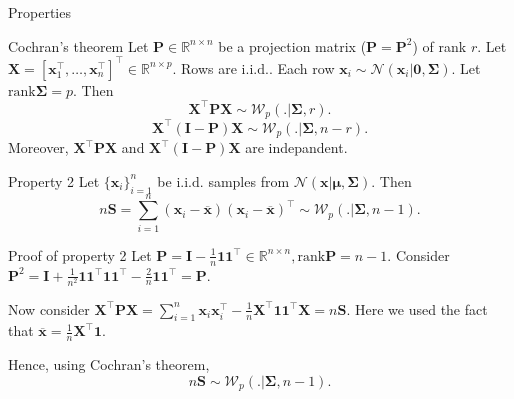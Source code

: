 \documentclass{beamer}
\begin{document}
\begin{frame}{Properties}
    \begin{block}{Cochran’s theorem}
        Let $\mathbf{P} \in \mathbb{R}^{n\times n}$ be a projection matrix
        ($\mathbf{P} = \mathbf{P}^2$) of rank $r$.
        Let $\mathbf{X} = [\mathbf{x}_1^\top, \ldots, \mathbf{x}_n^\top]^\top \in \mathbb{R}^{n\times p}$.
        Rows are $\mathrm{i.i.d.}$.
        Each row $\mathbf{x}_i \sim \mathcal{N}(\mathbf{x}_i|\mathbf{0}, \mathbf{\Sigma})$.
        Let $\mathrm{rank}\mathbf{\Sigma} = p$. Then
        \[
            \mathbf{X}^\top\mathbf{P}\mathbf{X} \sim \mathcal{W}_p(.|\mathbf{\Sigma}, r).
        \]
        \[
            \mathbf{X}^\top(\mathbf{I} - \mathbf{P})\mathbf{X} \sim \mathcal{W}_p(.|\mathbf{\Sigma}, n-r).
        \]
        Moreover, $\mathbf{X}^\top\mathbf{P}\mathbf{X}$ and $\mathbf{X}^\top(\mathbf{I} - \mathbf{P})\mathbf{X}$ are
        indepandent.
    \end{block}

    \begin{block}{Property 2}
    Let $\{\mathbf{x}_i\}_{i=1}^n$ be $\mathrm{i.i.d.}$ samples from
    $\mathcal{N}(\mathbf{x}|\boldsymbol\mu, \mathbf{\Sigma})$. Then
    \[
        n\mathbf{S} = \sum_{i=1}^n(\mathbf{x}_i - \overline{\mathbf{x}})(\mathbf{x}_i - \overline{\mathbf{x}})^\top
        \sim \mathcal{W}_p(.|\mathbf{\Sigma}, n - 1).
    \]
    \end{block}
\end{frame}


\begin{frame}{Proof of property 2}
    Let $\mathbf{P} = \mathbf{I} - \frac{1}{n}\mathbf{1}\mathbf{1}^\top \in \mathbb{R}^{n\times n}, \mathrm{rank}\mathbf{P} = n - 1$.
    Consider $\mathbf{P}^2 = \mathbf{I} + \frac{1}{n^2}\mathbf{1}\mathbf{1}^\top\mathbf{1}\mathbf{1}^\top
    - \frac{2}{n}\mathbf{1}\mathbf{1}^\top = \mathbf{P}$.
    
    Now consider $\mathbf{X}^\top\mathbf{P}\mathbf{X} = \sum_{i=1}^n\mathbf{x}_i\mathbf{x}_i^\top -\frac{1}{n}\mathbf{X}^\top\mathbf{1}\mathbf{1}^\top\mathbf{X} = n\mathbf{S}$.
    Here we used the fact that $\overline{\mathbf{x}} = \frac{1}{n}\mathbf{X}^\top\mathbf{1}$.

    Hence, using Cochran's theorem,
    \[
        n\mathbf{S} \sim \mathcal{W}_p(.|\mathbf{\Sigma}, n - 1).
    \]
\end{frame}
\end{document}
